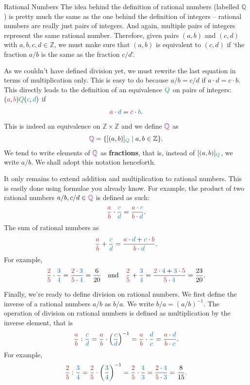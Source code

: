 \documentclass[final]{beamer}
\newlength{\colwidth}
\newcommand{\Z}{\mathbb{Z}}
\newcommand{\Q}{\mathbb{Q}}
\newcommand{\clr}{\textcolor{BrickRed}}
\newcommand{\clb}{\textcolor{RoyalBlue}}
\newcommand{\clg}{\textcolor{ForestGreen}}
\newcommand{\clm}{\textcolor{Fuchsia}}
\begin{document}
\begin{frame}[t]
\begin{columns}[t]
\begin{column}{\colwidth}
\begin{exampleblock}{Rational Numbers}
 The idea behind the definition of rational numbers (labelled $\Q$) is pretty
 much the same as the one behind the definition of integers -- rational numbers
 are really just \alert{pairs of integers}. And again, multiple pairs of
 integers \alert{represent the same} rational number. Therefore, given pairs
 $(a,b)$ and $(c,d)$ with $a,b,c,d \in \Z$, we must make sure that $(a,b)$
 \alert{is equivalent to} $(c,d)$ if `the fraction $a / b$ is the same as the
 fraction $c / d$'.

 As we couldn't have defined division yet, we must \alert{rewrite the last
 equation in terms of multiplication only}. This is easy to do because $a / b =
 c / d$ if $a \cdot d = c \cdot b$. This directly leads to the definition of an
 \alert{equivalence} $\clg{Q}$ on pairs of integers: $(\clr{a},
 \clr{b})\clg{Q}(\clb{c},\clb{d})$ if
 \[
  \clr{a} \cdot \clb{d} = \clr{c} \cdot \clb{b}.
 \]
 This is indeed an equivalence on $\Z \times \Z$ and we define $\clm{\Q}$ as
 \[
  \clm{\Q} = \{[(a,b)]_{\clg{Q}} \mid a,b \in \Z\}.
 \]
 We tend to write elements of $\clm{\Q}$ as \textbf{fractions}, that is, instead
 of $[(a,b)]_{\clg{Q}}$, we write $a / b$. We shall adopt this notation
 henceforth.

 It only remains to \alert{extend addition and multiplication} to rational
 numbers. This is easily done using formulae you already know. For example, the
 \alert{product} of two rational numbers $a / b, c / d \in \clm{\Q}$ is defined
 as such:
 \[
  \frac{\clr{a}}{\clr{b}} \cdot \frac{\clb{c}}{\clb{d}} = \frac{\clr{a} \cdot
  \clb{c}}{\clr{b} \cdot \clb{d}}.
 \]
 The \alert{sum} of rational numbers as
 \[
  \frac{\clr{a}}{\clr{b}} + \frac{\clb{c}}{\clb{d}} = \frac{\clr{a} \cdot
  \clb{d} + \clb{c} \cdot \clr{b}}{\clr{b} \cdot \clb{d}}.
 \]
 For example,
 \[
  \frac{\clr{2}}{\clr{5}} \cdot \frac{\clb{3}}{\clb{4}} = \frac{\clr{2} \cdot
  \clb{3}}{\clr{5} \cdot \clb{4}} = \frac{6}{20} \quad \text{and} \quad
  \frac{\clr{2}}{\clr{5}} + \frac{\clb{3}}{\clb{4}} = \frac{\clr{2} \cdot
  \clb{4} + \clb{3} \cdot \clr{5}}{\clr{5} \cdot \clb{4}} = \frac{23}{20}.
 \]
 
 Finally, we're ready to \alert{define division} on rational numbers. We first
 define the \alert{inverse} of a rational numbers $a / b$ as $b / a$. We write
 $b / a = (a / b)^{-1}$. The \alert{operation of division} on rational numbers
 is defined as \alert{multiplication by the inverse element}, that is
 \[
  \frac{\clr{a}}{\clr{b}} : \frac{\clb{c}}{\clb{d}} = \frac{\clr{a}}{\clr{b}}
  \cdot \left( \frac{\clb{c}}{\clb{d}} \right)^{-1} = \frac{\clr{a}}{\clr{b}}
  \cdot \frac{\clb{d}}{\clb{c}} = \frac{\clr{a} \cdot \clb{d}}{\clr{b} \cdot
  \clb{c}}.
 \]
 For example,
 \[
  \frac{\clr{2}}{\clr{5}} : \frac{\clb{3}}{\clb{4}} = \frac{\clr{2}}{\clr{5}}
 \cdot \left(\frac{\clb{3}}{\clb{4}}\right)^{-1} = \frac{\clr{2}}{\clr{5}} \cdot
 \frac{\clb{4}}{\clb{3}} = \frac{\clr{2} \cdot \clb{4}}{\clr{5} \cdot \clb{3}} =
 \frac{8}{15}.
 \]
\end{exampleblock}


\end{column}
\end{columns}
\end{frame}
\end{document}
